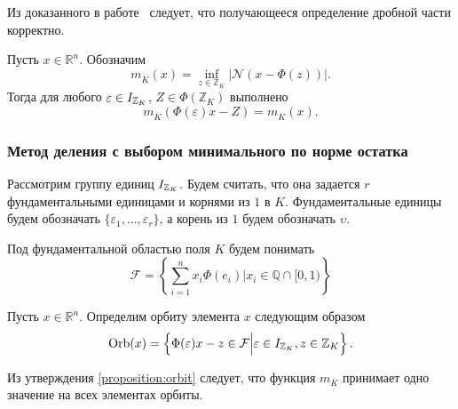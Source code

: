 \documentclass[_00_dissertation.tex]{subfiles}
\begin{document}
Из доказанного в работе~\cite{source:Lezowski} следует, что получающееся определение дробной части корректно.

\begin{proposition}\label{proposition:orbit}\cite{source:Lezowski}
    Пусть $x \in \mathbb{R}^n$.
    Обозначим
    \begin{equation*}
        m_{\overline{K}}(x) = \inf_{z\in\mathbb{Z}_K} |\mathcal{N}(x - \Phi(z))|.
    \end{equation*}
    Тогда для любого $\varepsilon \in I_{\mathbb{Z}_K}$, $Z \in \Phi(\mathbb{Z}_K)$ выполнено
    \begin{equation*}
        m_{\overline{K}}(\Phi(\varepsilon)x - Z) = m_{\overline{K}}(x).
    \end{equation*}
\end{proposition}

\subsubsection{Метод деления с выбором минимального по норме остатка}

Рассмотрим группу единиц $I_{\mathbb{Z}_K}$.
Будем считать, что она задается $r$ фундаментальными единицами и корнями из $1$ в $K$.
Фундаментальные единицы будем обозначать $\{\varepsilon_1, \dots, \varepsilon_r\}$, а корень из $1$ будем обозначать $\upsilon$.

\begin{definition}
    Под фундаментальной областью поля $K$ будем понимать
    \begin{equation*}
        \mathcal{F} = \left\{
            \sum\limits_{i=1}^n x_i\Phi(e_i) \Big| x_i \in \mathbb{Q}\cap[0, 1)
        \right\}
    \end{equation*}
\end{definition}

\begin{definition}
    Пусть $x\in \mathbb{R}^n$.
    Определим орбиту элемента $x$ следующим образом 
    \begin{equation*}
    	\textrm{Orb}(x) = \left\{
    		\Phi(\varepsilon)x - z \in \mathcal{F} \Big| \varepsilon \in I_{\mathbb{Z}_K}, z \in \mathbb{Z}_K
    	\right\}.
    \end{equation*}
\end{definition}

Из утверждения \ref{proposition:orbit} следует, что функция $m_{\overline{K}}$ принимает одно значение на всех элементах орбиты.
\end{document}

